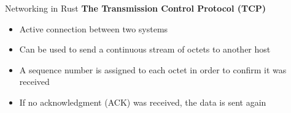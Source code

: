 \begin{frame}{Networking in Rust}
    \textbf{The Transmission Control Protocol (TCP)}

    \begin{itemize}
        \item<2-> Active connection between two systems
        \item<3-> Can be used to send a continuous stream of octets to another host
        \item<4-> A sequence number is assigned to each octet in order to confirm it was received
        \item<5> If no acknowledgment (ACK) was received, the data is sent again
    \end{itemize}

\end{frame}
